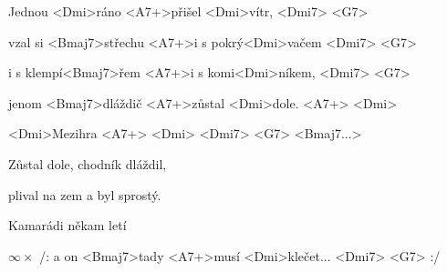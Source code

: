 

\zs
Jednou <Dmi>ráno <A7+>přišel <Dmi>vítr, <Dmi7> <G7>

vzal si <Bmaj7>střechu <A7+>i s pokrý<Dmi>vačem <Dmi7> <G7>

i s klempí<Bmaj7>řem <A7+>i s komi<Dmi>níkem, <Dmi7> <G7>

jenom <Bmaj7>dláždič <A7+>zůstal <Dmi>dole. <A7+> <Dmi>
\ks

<Dmi>Mezihra <A7+> <Dmi> <Dmi7> <G7> <Bmaj7...>

\zs
Zůstal dole, chodník dláždil,

plival na zem a byl sprostý.

Kamarádi někam letí

$\infty\times$ /: a on <Bmaj7>tady <A7+>musí <Dmi>klečet... 
<Dmi7> <G7> :/
\ks

\kp
